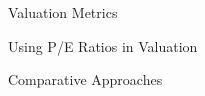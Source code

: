 \documentclass[10pt]{article}
\begin{document}
  \begin{core}{Valuation Metrics}







  \end{core}

  \begin{core}{Using P/E Ratios in Valuation}


  \end{core}

  \begin{core}{Comparative Approaches}


  \end{core}
\end{document}
